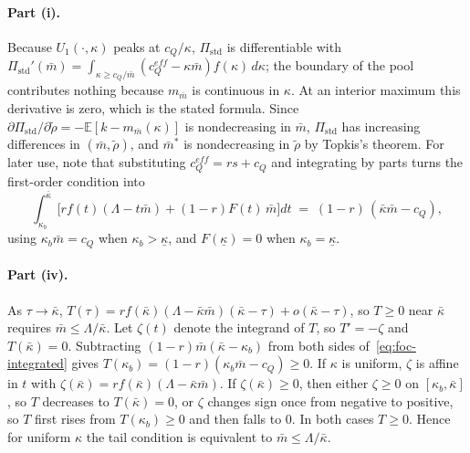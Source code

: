 \documentclass[11pt]{article}
\begin{document}
\paragraph{Part (i).} Because $U_1(\cdot,\kappa)$ peaks at $c_Q/\kappa$, $\Pi_{\text{std}}$ is differentiable with $\Pi_{\text{std}}'(\bar m) = \int_{\kappa \ge c_Q/\bar m} (c_Q^{eff} - \kappa\bar m) f(\kappa)\,d\kappa$; the boundary of the pool contributes nothing because $m_{\bar m}$ is continuous in $\kappa$. At an interior maximum this derivative is zero, which is the stated formula. Since $\partial\Pi_{\text{std}}/\partial\tilde\rho = -\mathbb{E}[k - m_{\bar m}(\kappa)]$ is nondecreasing in $\bar m$, $\Pi_{\text{std}}$ has increasing differences in $(\bar m, \tilde\rho)$, and $\bar m^*$ is nondecreasing in $\tilde\rho$ by Topkis's theorem. For later use, note that substituting $c_Q^{eff} = rs + c_Q$ and integrating by parts turns the first-order condition into
\begin{equation}
\int_{\kappa_b}^{\bar\kappa} \Big[ r f(t)(\Lambda - t\bar m) + (1-r) F(t)\,\bar m \Big] dt \;=\; (1-r)\,(\bar\kappa\bar m - c_Q),
\label{eq:foc-integrated}
\end{equation}
using $\kappa_b \bar m = c_Q$ when $\kappa_b > \underline\kappa$, and $F(\underline\kappa) = 0$ when $\kappa_b = \underline\kappa$.

\paragraph{Part (iv).} As $\tau \to \bar\kappa$, $T(\tau) = r f(\bar\kappa)(\Lambda - \bar\kappa\bar m)(\bar\kappa - \tau) + o(\bar\kappa - \tau)$, so $T \ge 0$ near $\bar\kappa$ requires $\bar m \le \Lambda/\bar\kappa$. Let $\zeta(t)$ denote the integrand of $T$, so $T' = -\zeta$ and $T(\bar\kappa) = 0$. Subtracting $(1-r)\bar m(\bar\kappa - \kappa_b)$ from both sides of~\eqref{eq:foc-integrated} gives $T(\kappa_b) = (1-r)(\kappa_b\bar m - c_Q) \ge 0$. If $\kappa$ is uniform, $\zeta$ is affine in $t$ with $\zeta(\bar\kappa) = r f(\bar\kappa)(\Lambda - \bar\kappa\bar m)$. If $\zeta(\bar\kappa) \ge 0$, then either $\zeta \ge 0$ on $[\kappa_b, \bar\kappa]$, so $T$ decreases to $T(\bar\kappa) = 0$, or $\zeta$ changes sign once from negative to positive, so $T$ first rises from $T(\kappa_b) \ge 0$ and then falls to $0$. In both cases $T \ge 0$. Hence for uniform $\kappa$ the tail condition is equivalent to $\bar m \le \Lambda/\bar\kappa$.
\end{document}
